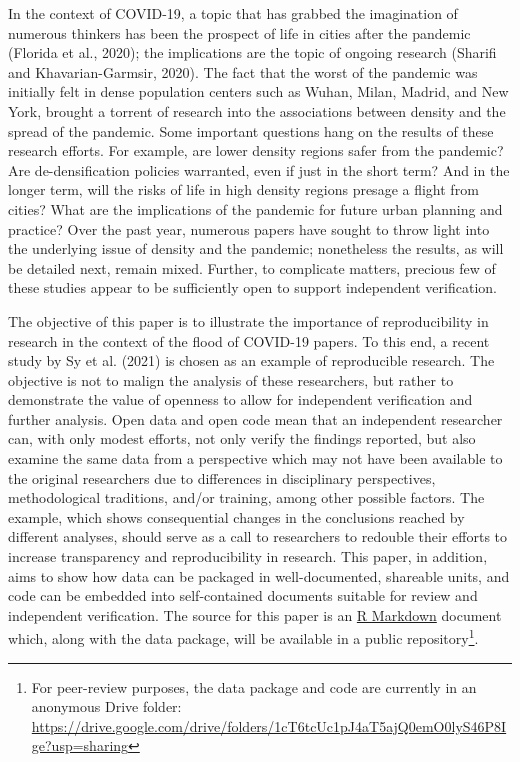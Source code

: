 \documentclass[]{elsarticle} %
\begin{document}
In the context of COVID-19, a topic that has grabbed the imagination of
numerous thinkers has been the prospect of life in cities after the
pandemic (Florida et al., 2020); the implications are the topic of
ongoing research (Sharifi and Khavarian-Garmsir, 2020). The fact that
the worst of the pandemic was initially felt in dense population centers
such as Wuhan, Milan, Madrid, and New York, brought a torrent of
research into the associations between density and the spread of the
pandemic. Some important questions hang on the results of these research
efforts. For example, are lower density regions safer from the pandemic?
Are de-densification policies warranted, even if just in the short term?
And in the longer term, will the risks of life in high density regions
presage a flight from cities? What are the implications of the pandemic
for future urban planning and practice? Over the past year, numerous
papers have sought to throw light into the underlying issue of density
and the pandemic; nonetheless the results, as will be detailed next,
remain mixed. Further, to complicate matters, precious few of these
studies appear to be sufficiently open to support independent
verification.

The objective of this paper is to illustrate the importance of
reproducibility in research in the context of the flood of COVID-19
papers. To this end, a recent study by Sy et al. (2021) is chosen as an
example of reproducible research. The objective is not to malign the
analysis of these researchers, but rather to demonstrate the value of
openness to allow for independent verification and further analysis.
Open data and open code mean that an independent researcher can, with
only modest efforts, not only verify the findings reported, but also
examine the same data from a perspective which may not have been
available to the original researchers due to differences in disciplinary
perspectives, methodological traditions, and/or training, among other
possible factors. The example, which shows consequential changes in the
conclusions reached by different analyses, should serve as a call to
researchers to redouble their efforts to increase transparency and
reproducibility in research. This paper, in addition, aims to show how
data can be packaged in well-documented, shareable units, and code can
be embedded into self-contained documents suitable for review and
independent verification. The source for this paper is an
\href{http://rmarkdown.rstudio.com}{R Markdown} document which, along
with the data package, will be available in a public
repository\footnote{For peer-review purposes, the data package and code
  are currently in an anonymous Drive folder:
  \url{https://drive.google.com/drive/folders/1cT6tcUc1pJ4aT5ajQ0emO0lyS46P8Ige?usp=sharing}}.
\end{document}
